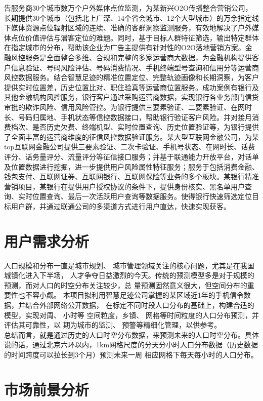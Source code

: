 告服务商30个城市数万个户外媒体点位监测，为某新兴O2O传播整合营销公司，长期提供30个城市（包括北上广深、14个省会城市、12个大型城市）的万余指定线下媒体资源点位辐射区域的连续、准确的客群洞察监测服务，有效地解决了户外媒体点位价值评估与潜客定位的难题。同时，基于目标人群特征筛选，输出特定群体在指定城市的分布，帮助该企业为广告主提供有针对性的O2O落地营销方案。金融风控服务是全面整合多维、合规和完整的多家运营商大数据，为金融机构提供客户信息验证、号码风险评估、号码消费情况、手机终端型号查询和信用分等运营商风控数据服务。结合智慧足迹的精准位置定位、完整轨迹画像和长期洞察，为客户提供实时位置差，历史位置比对、职住验真等运营商位置服务。成功案例有银行及其他金融机构风控服务，银行客户通过采购运营商数据，实现银行各业务部门信贷审批的欺诈风险、信用风险管控。为银行提供三要素验证、二要素验证、在网时长、号码归属地、手机状态等信控数据接口，帮助银行验证客户风险。并对接月消费档次、是否历史欠费、终端机型、实时位置查询、历史位置验证等，为银行提供了全面丰富的运营商维度的征信风控数据验证服务。某大型互联网金融公司，为某top互联网金融公司提供三要素验证、二次卡验证、手机号状态、在网时长、话费评分、话务量评分、流量评分等征信接口服务；并基于联通能力开放平台，对话单及位置数据进行挖掘，进一步提供用户风险属性特征服务；服务于包括消费金融、钱包支付、互联网证券、互联网银行、互联网保险等业务的多个板块。某银行精准营销项目，某银行在提供用户授权协议的条件下，提供身份核实、黑名单用户查询、实时位置查询、最后一次活跃用户查询等数据服务。使得银行快速筛选定位目标用户群，并通过联通公司的多渠道方式进行用户直达，快速实现获客。
\section{用户需求分析}
人口规模和分布一直是城市规划、 城市管理领域关注的核心问题，尤其是在我国城镇化进入下半场， 人才争夺日益激烈的今天。传统的预测模型多是对于规模的预测，而对人口的时空分布关注较少，总
量预测固然意义很大，但空间分布的重要性也不容小觑。 本项目拟利用智慧足迹公司掌握的某区域近1年的手机信令数据，并结合外部网络公开数据，
在标定不同时段人口分布的基础上，构建合适的模型，实现对周、 小时等
空间粒度，乡镇、 网格等时间粒度的人口分布预测，并评估其可靠性，以
期为城市的监测、 预警等精细化管理，以供参考。\\
\indent 总结而言，就是通过历史的人口时空分布数据，来预测未来的人口时空分布。具体说的话，通过北京六环以内，1km网格尺度的分天分小时人口分布数据（历史数据的时间跨度可以拉长到3个月）预测未来一周 相应网格下每天每小时的人口分布。
\section{市场前景分析}
